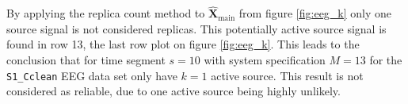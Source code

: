 By applying the replica count method to $\hat{\mathbf{X}}_{\text{main}}$  from figure \ref{fig:eeg_k} only one source signal is not considered replicas. 
This potentially active source signal is found in row 13, the last row plot on figure \ref{fig:eeg_k}. 
This leads to the conclusion that for time segment $s = 10$ with system specification $M = 13$ for the \texttt{S1\_Cclean} EEG data set only have $k = 1$ active source. This result is not considered as reliable, due to one active source being highly unlikely. 



